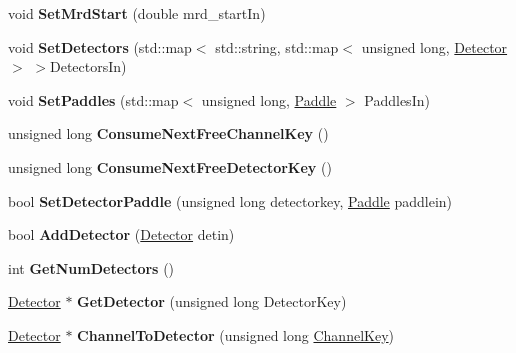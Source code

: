 \begin{DoxyCompactItemize}
\item 
\hypertarget{classGeometry_a100d585e24c6c52794741e280d4dd4c6}{
void {\bfseries SetMrdStart} (double mrd\_\-startIn)}
\label{classGeometry_a100d585e24c6c52794741e280d4dd4c6}

\item 
\hypertarget{classGeometry_a56df3f137af58d0cc3e1c6ed4b3eef43}{
void {\bfseries SetDetectors} (std::map$<$ std::string, std::map$<$ unsigned long, \hyperlink{classDetector}{Detector} $>$ $>$DetectorsIn)}
\label{classGeometry_a56df3f137af58d0cc3e1c6ed4b3eef43}

\item 
\hypertarget{classGeometry_a2af717e2ca1bd01e2b1685857a1ef5cd}{
void {\bfseries SetPaddles} (std::map$<$ unsigned long, \hyperlink{classPaddle}{Paddle} $>$ PaddlesIn)}
\label{classGeometry_a2af717e2ca1bd01e2b1685857a1ef5cd}

\item 
\hypertarget{classGeometry_ac5f3c966b7862b10af20fb83c9c45082}{
unsigned long {\bfseries ConsumeNextFreeChannelKey} ()}
\label{classGeometry_ac5f3c966b7862b10af20fb83c9c45082}

\item 
\hypertarget{classGeometry_aea3868f7e8a725f672a2e488fe95eb5f}{
unsigned long {\bfseries ConsumeNextFreeDetectorKey} ()}
\label{classGeometry_aea3868f7e8a725f672a2e488fe95eb5f}

\item 
\hypertarget{classGeometry_a2c49049f0ee7b77f1bd28ca6a95c4d5a}{
bool {\bfseries SetDetectorPaddle} (unsigned long detectorkey, \hyperlink{classPaddle}{Paddle} paddlein)}
\label{classGeometry_a2c49049f0ee7b77f1bd28ca6a95c4d5a}

\item 
\hypertarget{classGeometry_aedc8d0b00db707eb63177b3fbc55e7f7}{
bool {\bfseries AddDetector} (\hyperlink{classDetector}{Detector} detin)}
\label{classGeometry_aedc8d0b00db707eb63177b3fbc55e7f7}

\item 
\hypertarget{classGeometry_a9c164587d17b71fb8cbcfa0535dca18f}{
int {\bfseries GetNumDetectors} ()}
\label{classGeometry_a9c164587d17b71fb8cbcfa0535dca18f}

\item 
\hypertarget{classGeometry_a3b4131297b0329603c7700e7eed9cf0b}{
\hyperlink{classDetector}{Detector} $\ast$ {\bfseries GetDetector} (unsigned long DetectorKey)}
\label{classGeometry_a3b4131297b0329603c7700e7eed9cf0b}

\item 
\hypertarget{classGeometry_a6091d6b92a17207fdda50a03cc64b381}{
\hyperlink{classDetector}{Detector} $\ast$ {\bfseries ChannelToDetector} (unsigned long \hyperlink{classChannelKey}{ChannelKey})}
\label{classGeometry_a6091d6b92a17207fdda50a03cc64b381}


\end{DoxyCompactItemize}
